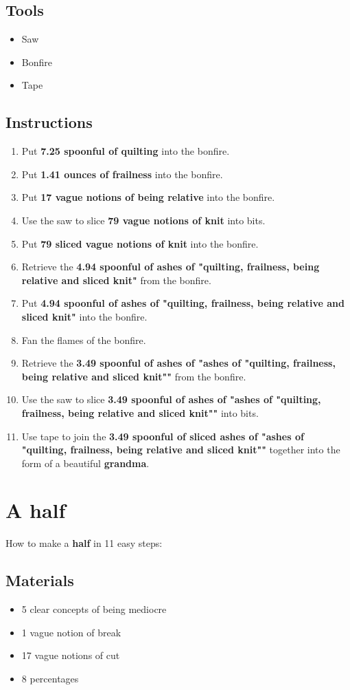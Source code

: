\documentclass{article}
\begin{document}
\subsection{Tools}\begin{itemize}
\item 
Saw
\item 
Bonfire
\item 
Tape
\end{itemize}
\subsection{Instructions}\begin{enumerate}
\item 
Put \textbf{7.25 spoonful of quilting} into the bonfire.
\item 
Put \textbf{1.41 ounces of frailness} into the bonfire.
\item 
Put \textbf{17 vague notions of being relative} into the bonfire.
\item 
Use the saw to slice \textbf{79 vague notions of knit} into bits.
\item 
Put \textbf{79 sliced vague notions of knit} into the bonfire.
\item 
Retrieve the \textbf{4.94 spoonful of ashes of "quilting, frailness, being relative and sliced knit"} from the bonfire.
\item 
Put \textbf{4.94 spoonful of ashes of "quilting, frailness, being relative and sliced knit"} into the bonfire.
\item 
Fan the flames of the bonfire.
\item 
Retrieve the \textbf{3.49 spoonful of ashes of "ashes of "quilting, frailness, being relative and sliced knit""} from the bonfire.
\item 
Use the saw to slice \textbf{3.49 spoonful of ashes of "ashes of "quilting, frailness, being relative and sliced knit""} into bits.
\item 
Use tape to join the \textbf{3.49 spoonful of sliced ashes of "ashes of "quilting, frailness, being relative and sliced knit""} together into the form of a beautiful \textbf{grandma}.
\end{enumerate}
\newpage
\section{A half}How to make a \textbf{half} in 11 easy steps:

\subsection{Materials}\begin{itemize}
\item 
5 clear concepts of being mediocre
\item 
1 vague notion of break
\item 
17 vague notions of cut
\item 
8 percentages
\end{itemize}
\end{document}
